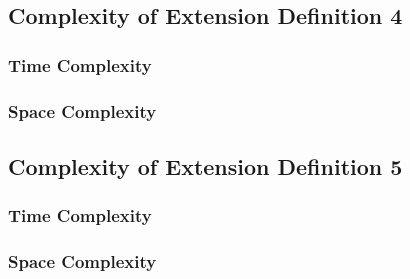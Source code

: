 \documentclass[conference]{IEEEtran}
\begin{document}
\subsection{Complexity of Extension Definition 4}

\subsubsection{Time Complexity}

\subsubsection{Space Complexity}

\subsection{Complexity of Extension Definition 5}

\subsubsection{Time Complexity}

\subsubsection{Space Complexity}



\onecolumn
\clearpage
\lstset{basicstyle=\ttfamily, breaklines=true}

\end{document}
